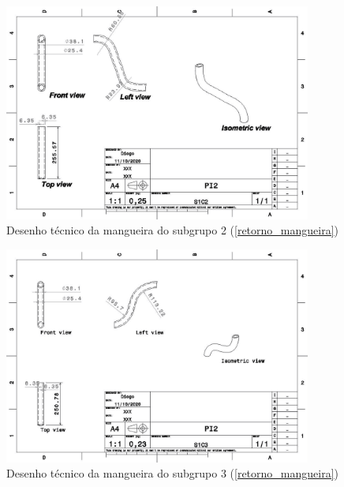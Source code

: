 \begin{apendicesenv}
\begin{figure}[H]
    \centering
    \includegraphics[width=0.9\textwidth]{figuras/estrutura/Desenhos/Drawing1_S1C2.jpg}
    \caption{Desenho técnico da mangueira do subgrupo 2 (\ref{retorno_mangueira})}
    \label{fig:M_S2}
\end{figure}

\begin{figure}[H]
    \centering
    \includegraphics[width=0.9\textwidth]{figuras/estrutura/Desenhos/Drawing1_S1C3.jpg}
    \caption{Desenho técnico da mangueira do subgrupo 3 (\ref{retorno_mangueira})}
    \label{fig:M_S3}
\end{figure}


\end{apendicesenv}
